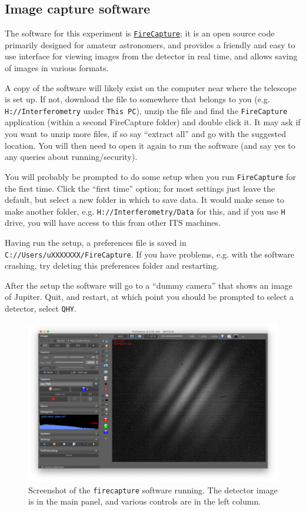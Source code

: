 \documentclass[11pt]{article}
\begin{document}
\subsection{Image capture software}\label{sec:software}

The software for this experiment is \href{http://www.firecapture.de/}{\texttt{FireCapture}}; it is an open source code primarily designed for amateur astronomers, and provides a friendly and easy to use interface for viewing images from the detector in real time, and allows saving of images in various formats.

A copy of the software will likely exist on the computer near where the telescope is set up. If not, download the file to somewhere that belongs to you (e.g. \texttt{H://Interferometry} under \texttt{This PC}), unzip the file and find the \texttt{FireCapture} application (within a second FireCapture folder) and double click it. It may ask if you want to unzip more files, if so say ``extract all'' and go with the suggested location. You will then need to open it again to run the software (and say yes to any queries about running/security).

You will probably be prompted to do some setup when you run \texttt{FireCapture} for the first time. Click the ``first time'' option; for most settings just leave the default, but select a new folder in which to save data. It would make sense to make another folder, e.g. \texttt{H://Interferometry/Data} for this, and if you use \texttt{H} drive, you will have access to this from other ITS machines.

Having run the setup, a preferences file is saved in \texttt{C://Users/uXXXXXXX/FireCapture}. If you have problems, e.g. with the software crashing, try deleting this preferences folder and restarting.

After the setup the software will go to a ``dummy camera'' that shows an image of Jupiter. Quit, and restart, at which point you should be prompted to select a detector, select \texttt{QHY}.

\begin{figure}[h]
    \centering
    \includegraphics[width=1\textwidth]{doc/fc.png}
    \caption{Screenshot of the \texttt{firecapture} software running. The detector image is in the main panel, and various controls are in the left column.}
    \label{fig:fc}
\end{figure}
\end{document}
